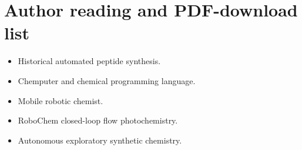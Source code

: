 \section*{Author reading and PDF-download list}

\begin{itemize}
  \item Historical automated peptide synthesis.
  \item Chemputer and chemical programming language.
  \item Mobile robotic chemist.
  \item RoboChem closed-loop flow photochemistry.
  \item Autonomous exploratory synthetic chemistry.
\end{itemize}
